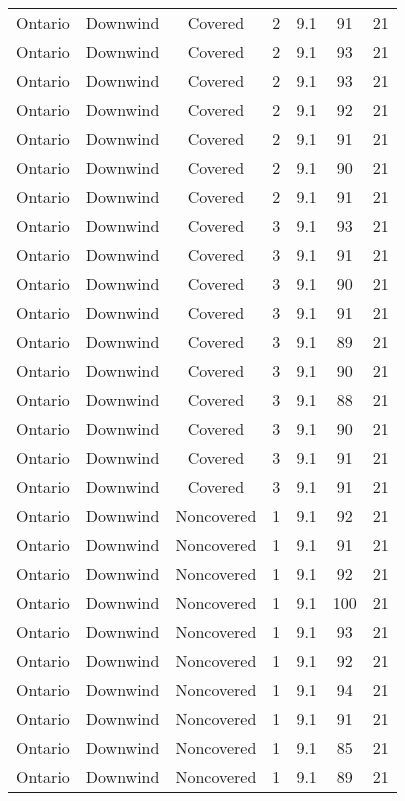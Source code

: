 \documentclass{article}
\begin{document}
\begin{longtable}[H]{ccccccc}
Ontario & Downwind & Covered     & 2 & 9.1  & 91  & 21 \\
Ontario & Downwind & Covered     & 2 & 9.1  & 93  & 21 \\
Ontario & Downwind & Covered     & 2 & 9.1  & 93  & 21 \\
Ontario & Downwind & Covered     & 2 & 9.1  & 92  & 21 \\
Ontario & Downwind & Covered     & 2 & 9.1  & 91  & 21 \\
Ontario & Downwind & Covered     & 2 & 9.1  & 90  & 21 \\
Ontario & Downwind & Covered     & 2 & 9.1  & 91  & 21 \\
Ontario & Downwind & Covered     & 3 & 9.1  & 93  & 21 \\
Ontario & Downwind & Covered     & 3 & 9.1  & 91  & 21 \\
Ontario & Downwind & Covered     & 3 & 9.1  & 90  & 21 \\
Ontario & Downwind & Covered     & 3 & 9.1  & 91  & 21 \\
Ontario & Downwind & Covered     & 3 & 9.1  & 89  & 21 \\
Ontario & Downwind & Covered     & 3 & 9.1  & 90  & 21 \\
Ontario & Downwind & Covered     & 3 & 9.1  & 88  & 21 \\
Ontario & Downwind & Covered     & 3 & 9.1  & 90  & 21 \\
Ontario & Downwind & Covered     & 3 & 9.1  & 91  & 21 \\
Ontario & Downwind & Covered     & 3 & 9.1  & 91  & 21 \\
Ontario & Downwind & Noncovered & 1 & 9.1  & 92  & 21 \\
Ontario & Downwind & Noncovered & 1 & 9.1  & 91  & 21 \\
Ontario & Downwind & Noncovered & 1 & 9.1  & 92  & 21 \\
Ontario & Downwind & Noncovered & 1 & 9.1  & 100 & 21 \\
Ontario & Downwind & Noncovered & 1 & 9.1  & 93  & 21 \\
Ontario & Downwind & Noncovered & 1 & 9.1  & 92  & 21 \\
Ontario & Downwind & Noncovered & 1 & 9.1  & 94  & 21 \\
Ontario & Downwind & Noncovered & 1 & 9.1  & 91  & 21 \\
Ontario & Downwind & Noncovered & 1 & 9.1  & 85  & 21 \\
Ontario & Downwind & Noncovered & 1 & 9.1  & 89  & 21 \\

\end{longtable}
\end{document}
